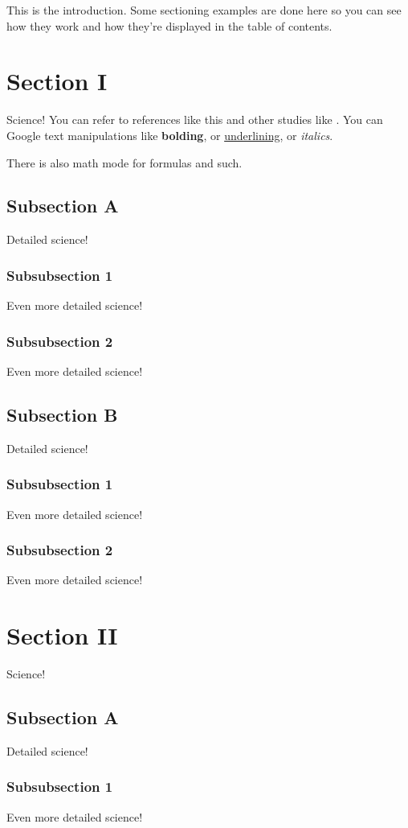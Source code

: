 This is the introduction. Some sectioning examples are done here so you can see how they work and how they're displayed in the table of contents. 

\section{Section I}

Science! You can refer to references like this \cite{Fu2000} and other studies like \cite{Darwin2001}. You can Google text manipulations like \textbf{bolding}, or \underline{underlining}, or \textit{italics}. 

There is also math mode for formulas and such. 

\subsection{Subsection A}

Detailed science!

\subsubsection{Subsubsection 1}

Even more detailed science!

\subsubsection{Subsubsection 2}

Even more detailed science!

\subsection{Subsection B}

Detailed science!

\subsubsection{Subsubsection 1}

Even more detailed science!

\subsubsection{Subsubsection 2}

Even more detailed science!

\section{Section II}

Science!

\subsection{Subsection A}

Detailed science!

\subsubsection{Subsubsection 1}

Even more detailed science!

\clearpage
